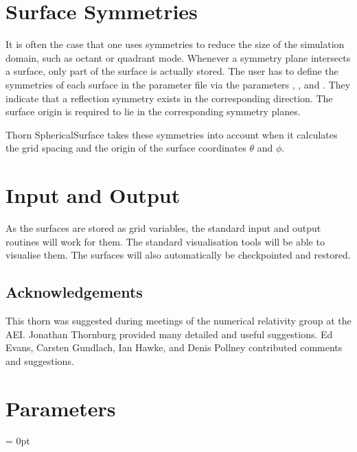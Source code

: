 \section{Surface Symmetries}

It is often the case that one uses symmetries to reduce the size of
the simulation domain, such as octant or quadrant mode.  Whenever a
symmetry plane intersects a surface, only part of the surface is
actually stored.  The user has to define the symmetries of each
surface in the parameter file via the parameters
, , and
.  They indicate that a 
reflection symmetry exists in the corresponding direction.  The
surface origin is required to lie in the corresponding symmetry
planes.

Thorn SphericalSurface takes these symmetries into account when it
calculates the grid spacing and the origin of the surface coordinates
$\theta$ and $\phi$.



\section{Input and Output}

As the surfaces are stored as grid variables, the standard input and
output routines will work for them.  The standard visualisation tools
will be able to visualise them.  The surfaces will also automatically
be checkpointed and restored.



\subsection{Acknowledgements}

This thorn was suggested during meetings of the numerical relativity
group at the AEI.  Jonathan Thornburg provided many detailed and
useful suggestions.  Ed Evans, Carsten Gundlach, Ian Hawke, and Denis
Pollney contributed comments and suggestions.




\section{Parameters} 


\parskip = 0pt

\setlength{\tableWidth}{160mm}

